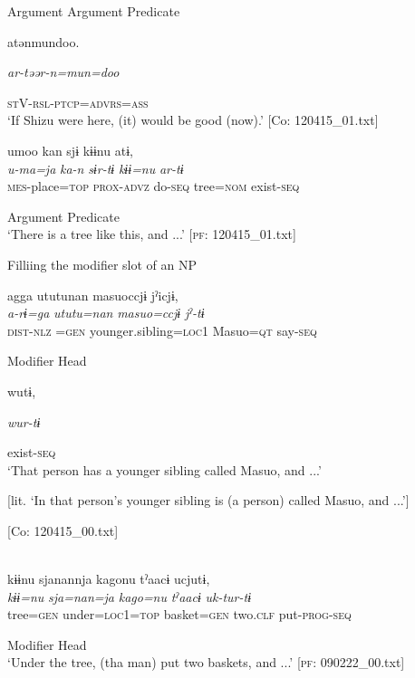 \begin{table}
      Argument  Argument  Predicate  

      atənmundoo.

      \textit{ar-təər-n=mun=doo}

      \textsc{st}V-\textsc{rsl}-\textsc{ptcp}=\textsc{advrs}=\textsc{ass}\\
\glt ‘If Shizu were here, (it) would be good (now).’ [Co: 120415\_01.txt]
\z

\ex {\TM}  umoo  kan  sjɨ  kɨɨnu  atɨ,\\
\glll \textit{u-ma=ja}  \textit{ka-n}  \textit{sɨr-tɨ}  \textit{kɨɨ=nu}  \textit{ar-tɨ}\\
\textsc{mes}-place=\textsc{top}  \textsc{prox}-\textsc{advz}  do-\textsc{seq}  tree=\textsc{nom}  exist-\textsc{seq}

            Argument  Predicate\\
\glt ‘There is a tree like this, and ...’ [\textsc{pf}: 120415\_01.txt]
\z

  Filliing the modifier slot of an NP

\ex {\TM}  agga  ututunan  masuoccjɨ  jˀicjɨ,\\
\glll \textit{a-rɨ=ga}  \textit{ututu=nan}  \textit{masuo=ccjɨ}  \textit{jˀ-tɨ}\\
\textsc{dist}-\textsc{nlz} =\textsc{gen}  younger.sibling=\textsc{loc}1  Masuo=\textsc{qt}  say-\textsc{seq}

      Modifier  Head    

      wutɨ,

      \textit{wur-tɨ}

      exist-\textsc{seq}\\
\glt ‘That person has a younger sibling called Masuo, and ...’

[lit. ‘In that person’s younger sibling is (a person) called Masuo, and ...’]

      [Co: 120415\_00.txt]
\z

\ex\relax[= (\ref{ex:6-62}a)]\\
{\TM}
\glll  kɨɨnu  sjanannja  kagonu  tˀaacɨ  ucjutɨ,\\
\textit{kɨɨ=nu}  \textit{sja=nan=ja}  \textit{kago=nu}  \textit{tˀaacɨ}  \textit{uk-tur-tɨ}\\
tree=\textsc{gen}  under=\textsc{loc}1=\textsc{top}  basket=\textsc{gen}  two.\textsc{clf}  put-\textsc{prog}-\textsc{seq}

      Modifier  Head      \\
\glt ‘Under the tree, (tha man) put two baskets, and ...’ [\textsc{pf}: 090222\_00.txt]
\z


\end{table}
